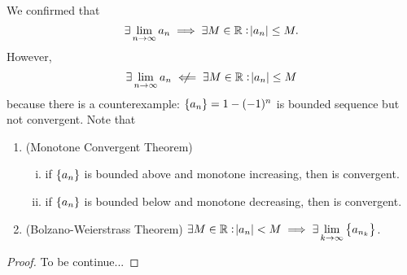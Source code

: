 \documentclass[11pt,openany]{article}
\begin{document}
We confirmed that \[
\exists\lim_{n\to\infty}a_n\implies\exists M\in\mathbb{R}: \abs{a_n}\leq M.
\] However, \[
\exists\lim_{n\to\infty}a_n\centernot\impliedby\exists M\in\R: \abs{a_n}\leq M
\] because there is a counterexample: $\set{a_n}=1-(-1)^n$ is bounded sequence but not convergent. Note that \begin{enumerate}
	\item (Monotone Convergent Theorem) \begin{enumerate}[(i)]
		\item if $\set{a_n}$ is bounded above and monotone increasing, then is convergent.
		\item if $\set{a_n}$ is bounded below and monotone decreasing, then is convergent.
	\end{enumerate}
	\item (Bolzano-Weierstrass Theorem) $\exists M\in\mathbb{R}:\abs{a_n}<M\implies\exists\lim\limits_{k\to\infty}\set{a_{n_k}}$.
\end{enumerate}
\newpage
{}
\begin{proof}
	To be continue...
\end{proof}
\end{document}

